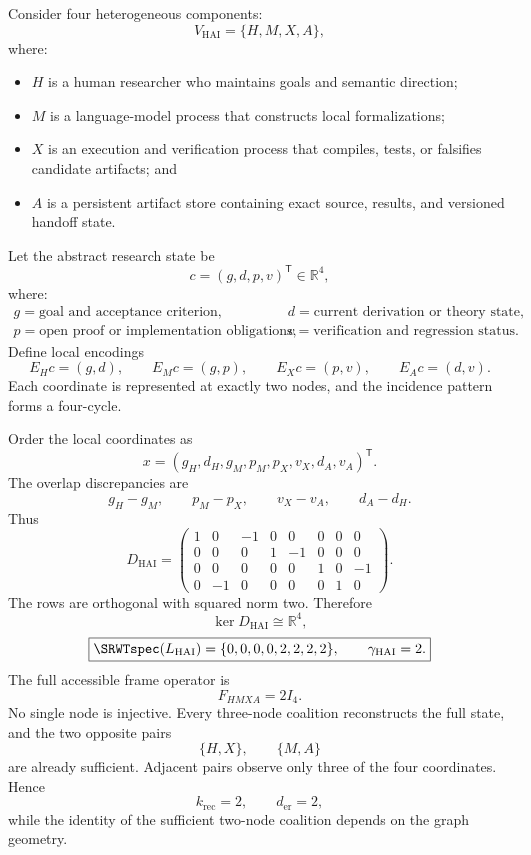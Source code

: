 Consider four heterogeneous components:
\[
V_{\mathrm{HAI}}=\{H,M,X,A\},
\]
where:
\begin{itemize}
\item \(H\) is a human researcher who maintains goals and semantic direction;
\item \(M\) is a language-model process that constructs local formalizations;
\item \(X\) is an execution and verification process that compiles, tests, or
 falsifies candidate artifacts; and
\item \(A\) is a persistent artifact store containing exact source, results,
 and versioned handoff state.
\end{itemize}
Let the abstract research state be
\[
c=(g,d,p,v)^{\mathsf T}\in\mathbb R^4,
\]
where:
\[
\begin{array}{ll}
g=\text{goal and acceptance criterion},
&d=\text{current derivation or theory state},\\
p=\text{open proof or implementation obligations},
&v=\text{verification and regression status}.
\end{array}
\]
Define local encodings
\[
E_Hc=(g,d),
\qquad
E_Mc=(g,p),
\qquad
E_Xc=(p,v),
\qquad
E_Ac=(d,v).
\]
Each coordinate is represented at exactly two nodes, and the incidence pattern
forms a four-cycle.


Order the local coordinates as
\[
x=(g_H,d_H,g_M,p_M,p_X,v_X,d_A,v_A)^{\mathsf T}.
\]
The overlap discrepancies are
\[
g_H-g_M,
\qquad
p_M-p_X,
\qquad
v_X-v_A,
\qquad
d_A-d_H.
\]
Thus
\[
D_{\mathrm{HAI}}
=
\begin{pmatrix}
1&0&-1&0&0&0&0&0\\
0&0&0&1&-1&0&0&0\\
0&0&0&0&0&1&0&-1\\
0&-1&0&0&0&0&1&0
\end{pmatrix}.
\]
The rows are orthogonal with squared norm two. Therefore
\[
\ker D_{\mathrm{HAI}}
\cong\mathbb R^4,
\]
\[
\boxed{
\SRWTspec(L_{\mathrm{HAI}})
=
\{0,0,0,0,2,2,2,2\},
\qquad
\gamma_{\mathrm{HAI}}=2.
}
\]
The full accessible frame operator is
\[
F_{HMXA}=2I_4.
\]
No single node is injective. Every three-node coalition reconstructs the full
state, and the two opposite pairs
\[
\{H,X\},
\qquad
\{M,A\}
\]
are already sufficient. Adjacent pairs observe only three of the four
coordinates. Hence
\[
k_{\mathrm{rec}}=2,
\qquad
d_{\mathrm{er}}=2,
\]
while the identity of the sufficient two-node coalition depends on the graph
geometry.

